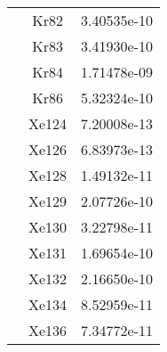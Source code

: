 \begin{centering}
\begin{longtable}{l c c}
& Kr82 & 3.40535e-10 \\ 
& Kr83 & 3.41930e-10 \\ 
& Kr84 & 1.71478e-09 \\ 
& Kr86 & 5.32324e-10 \\ 
& Xe124 & 7.20008e-13 \\ 
& Xe126 & 6.83973e-13 \\ 
& Xe128 & 1.49132e-11 \\ 
& Xe129 & 2.07726e-10 \\ 
& Xe130 & 3.22798e-11 \\ 
& Xe131 & 1.69654e-10 \\ 
& Xe132 & 2.16650e-10 \\ 
& Xe134 & 8.52959e-11 \\ 
& Xe136 & 7.34772e-11 \\ 
\hline
\bottomrule
\end{longtable}
\end{centering}
